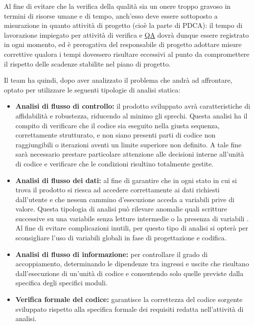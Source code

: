 Al fine di evitare che la verifica della qualità sia un onere troppo gravoso in termini di risorse umane e di tempo, anch'esso deve essere sottoposto a misurazione in quanto attività di progetto (cioè la parte  di PDCA): il tempo di lavorazione impiegato per attività di verifica e \underline{QA} dovrà dunque essere registrato in ogni momento, ed è prerogativa del responsabile di progetto adottare misure correttive qualora i tempi dovessero risultare eccessivi al punto da compromettere il rispetto delle scadenze stabilite nel piano di progetto.

Il team ha quindi, dopo aver analizzato il problema che andrà ad affrontare, optato per utilizzare le seguenti tipologie di analisi statica: 
\begin{itemize}

\item \textbf{Analisi di flusso di controllo:} il prodotto sviluppato avrà caratteristiche di affidabilità e robustezza, riducendo al minimo gli sprechi. Questa analisi ha il compito di verificare che il codice sia eseguito nella giusta sequenza, correttamente strutturato, e non siano presenti parti di codice non raggiungibili o iterazioni aventi un limite superiore non definito. A tale fine sarà necessario prestare particolare attenzione alle decisioni interne all'unità di codice e verificare che le condizioni risultino totalmente gestite.

\item \textbf{Analisi di flusso dei dati:} al fine di garantire che in ogni stato in cui si trova il prodotto si riesca ad accedere correttamente ai dati richiesti dall'utente e che nessun cammino d'esecuzione acceda a variabili prive di valore. 
Questa tipologia di analisi può rilevare anomalie quali scritture successive su una variabile senza letture intermedie o la presenza di variabili . Al fine di evitare complicazioni inutili, per questo tipo di analisi si opterà per sconsigliare l'uso di variabili globali in fase di progettazione e codifica.

\item \textbf{Analisi di flusso di informazione:} per controllare il grado di accoppiamento, determinando le dipendenze tra ingressi e uscite che risultano dall'esecuzione di un'unità di codice e consentendo solo quelle previste dalla specifica degli specifici moduli.

\item \textbf{Verifica formale del codice:} garantisce la correttezza del codice sorgente sviluppato rispetto alla specifica formale dei requisiti redatta nell'attività di analisi.
\end{itemize}

